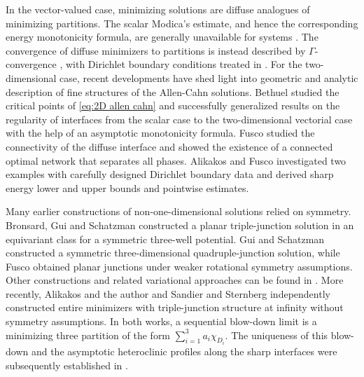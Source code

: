 \documentclass[leqno,11pt]{amsart}
\theoremstyle{remark}
\begin{document}
In the vector-valued case, minimizing solutions are diffuse analogues of minimizing partitions. The scalar Modica's estimate, and hence the corresponding energy monotonicity formula, are generally unavailable for systems \cite{afs-book,bethuel2025asymptotics}. The convergence of diffuse minimizers to partitions is instead described by $\Gamma$-convergence \cite{Baldo,sternberg1988effect,fonseca1989gradient}, with Dirichlet boundary conditions treated in \cite{gazoulis}. For the two-dimensional case, recent developments have shed light into geometric and analytic description of fine structures of the Allen-Cahn solutions. Bethuel \cite{bethuel2025asymptotics} studied the critical points of \eqref{eq:2D allen cahn} and successfully generalized results on the regularity of interfaces from the scalar case to the two-dimensional vectorial case with the help of an asymptotic monotonicity formula. Fusco \cite{fusco2025connectivity} studied the connectivity of the diffuse interface and showed the existence of a connected optimal network that separates all phases. Alikakos and Fusco \cite{AF} investigated two examples with carefully designed Dirichlet boundary data and derived sharp energy lower and upper bounds and pointwise estimates.

Many earlier constructions of non-one-dimensional solutions relied on symmetry. Bronsard, Gui and Schatzman \cite{bronsard1996three} constructed a planar triple-junction solution in an equivariant class for a symmetric three-well potential. Gui and Schatzman \cite{gui2008symmetric} constructed a symmetric three-dimensional quadruple-junction solution, while Fusco \cite{fusco} obtained planar junctions under weaker rotational symmetry assumptions. Other constructions and related variational approaches can be found in \cite{sternberg1994local,flores2001higher,schatzman2002asymmetric, fusco2017layered,monteil2017metric}. More recently, Alikakos and the author \cite{alikakos2024triple} and Sandier and Sternberg \cite{ss2024} independently constructed entire minimizers with triple-junction structure at infinity without symmetry assumptions. In both works, a sequential blow-down limit is a minimizing three partition of the form $\sum_{i=1}^{3}a_i\chi_{D_i}$. The uniqueness of this blow-down and the asymptotic heteroclinic profiles along the sharp interfaces were subsequently established in \cite{geng2025uniqueness,geng2025rigidity}.
\end{document}
